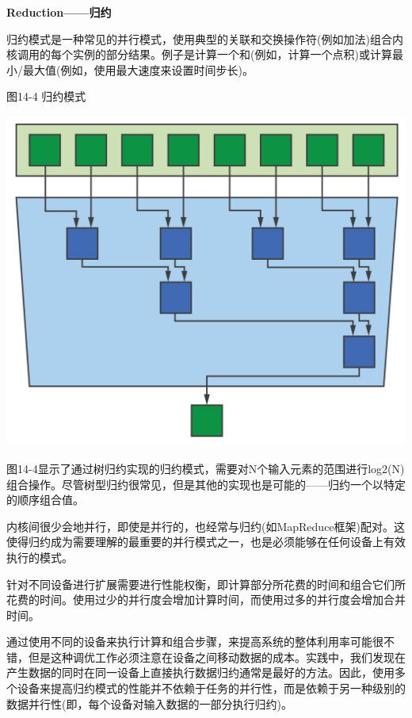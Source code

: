 \hspace*{\fill} \par %
\textbf{Reduction——归约}

归约模式是一种常见的并行模式，使用典型的关联和交换操作符(例如加法)组合内核调用的每个实例的部分结果。例子是计算一个和(例如，计算一个点积)或计算最小/最大值(例如，使用最大速度来设置时间步长)。\par

\hspace*{\fill} \par %
图14-4 归约模式
\begin{center}
	\includegraphics[width=1.\textwidth]{content/chapter-14/images/4}
\end{center}

图14-4显示了通过树归约实现的归约模式，需要对N个输入元素的范围进行log2(N)组合操作。尽管树型归约很常见，但是其他的实现也是可能的——归约一个以特定的顺序组合值。\par

内核间很少会地并行，即使是并行的，也经常与归约(如MapReduce框架)配对。这使得归约成为需要理解的最重要的并行模式之一，也是必须能够在任何设备上有效执行的模式。\par

针对不同设备进行扩展需要进行性能权衡，即计算部分所花费的时间和组合它们所花费的时间。使用过少的并行度会增加计算时间，而使用过多的并行度会增加合并时间。\par

通过使用不同的设备来执行计算和组合步骤，来提高系统的整体利用率可能很不错，但是这种调优工作必须注意在设备之间移动数据的成本。实践中，我们发现在产生数据的同时在同一设备上直接执行数据归约通常是最好的方法。因此，使用多个设备来提高归约模式的性能并不依赖于任务的并行性，而是依赖于另一种级别的数据并行性(即，每个设备对输入数据的一部分执行归约)。\par

